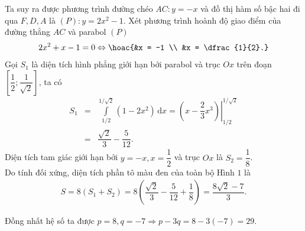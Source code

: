\begin{ex}
{\begin{center}
			\end{center}			
			Ta suy ra được phương trình đường chéo $AC \colon y = -x$ và đồ thị hàm số bậc hai đi qua $F, D, A$ là $(P) \colon y = 2x^2 - 1$.			
			Xét phương trình hoành độ giao điểm của đường thẳng $AC$ và parabol $(P)$
			\allowdisplaybreaks 
			\begin{eqnarray*} 
				2x^2 + x - 1 = 0 \Leftrightarrow \hoac{&x = -1 \\ &x = \dfrac{1}{2}.}
			\end{eqnarray*} 			
			Gọi $S_1$ là diện tích hình phẳng giới hạn bởi parabol và trục $Ox$ trên đoạn $\left[\dfrac{1}{2}; \dfrac{1}{\sqrt{2}}\right]$, ta có
			\allowdisplaybreaks 
			\begin{eqnarray*} 
				S_1 &=& \displaystyle\int\limits_{1/2}^{1/\sqrt{2}} (1 - 2x^2) \mathrm{\,d}x = \left. \left( x - \dfrac{2}{3}x^3 \right) \right|_{1/2}^{1/\sqrt{2}} \\
				&=& \dfrac{\sqrt{2}}{3} - \dfrac{5}{12}.			\end{eqnarray*} 				
		Diện tích tam giác giới hạn bởi $y = -x, x = \dfrac{1}{2}$ và trục $Ox$ là $S_2 = \dfrac{1}{8}$.\\		
		Do tính đối xứng, diện tích phần tô màu đen của toàn bộ Hình $1$ là
		\allowdisplaybreaks 
		\begin{eqnarray*} 
			S = 8(S_1 + S_2) = 8\left( \dfrac{\sqrt{2}}{3} - \dfrac{5}{12} + \dfrac{1}{8} \right) = \dfrac{8\sqrt{2} - 7}{3}.
		\end{eqnarray*} 
		
		Đồng nhất hệ số ta được $p = 8, q = -7 \Rightarrow p - 3q = 8 - 3(-7) = 29$.
	}
\end{ex}


